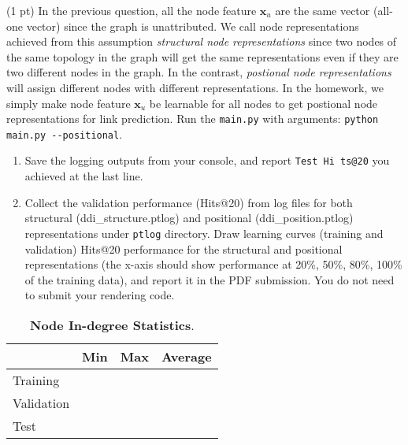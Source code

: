 \documentclass{article}
\newcommand{\vx}{\bm{x}}
\begin{document}
\begin{enumerate}
    (1 pt)
    In the previous question, all the node feature $\vx_{u}$ are the same
    vector (all-one vector) since the graph is unattributed.
    We call node representations achieved from this assumption \emph{structural
    node representations} since two nodes of the same topology in the graph
    will get the same representations even if they are two different nodes in
    the graph.
    In the contrast, \emph{postional node representations} will assign
    different nodes with different representations.
    In the homework, we simply make node feature $\vx_{u}$ be learnable for all
    nodes to get postional node representations for link prediction.
    Run the \texttt{main.py} with arguments:
    \verb|python main.py --positional|.
    \begin{enumerate}
        \item
        Save the logging outputs from your console, and report \texttt{Test Hi%
        ts@20} you achieved at the last line.
        \item
        Collect the validation performance (Hits@20) from log files for both
        structural (ddi\_structure.ptlog) and positional (ddi\_position.ptlog)
        representations under \texttt{ptlog} directory.
        Draw learning curves (training and validation) Hits@20 performance for the structural and positional representations (the x-axis should show performance at 20\%, 50\%, 80\%, 100\% of the training data), and report it in the PDF submission.
        You do not need to submit your rendering code.
    \end{enumerate}
%
\end{enumerate}

%
\begin{table}
\caption{\textbf{Node In-degree Statistics}.}
\label{tab:indeg}
\begin{center}
\centering
\begin{tabular}{l|rrr}
    \hline
    & Min & Max & Average
    \\
    \hline
    Training & & &
    \\
    \hline
    Validation & & &
    \\
    \hline
    Test & & &
    \\
    \hline
\end{tabular}
\end{center}
\end{table}

\end{document}
